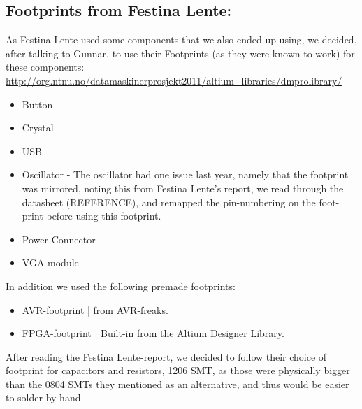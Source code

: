 \subsection{Footprints from Festina Lente:}
As Festina Lente used some components that we also ended up using, we decided,
after talking to Gunnar, to use
their Footprints (as they were known to work) for these components:
\url{http://org.ntnu.no/datamaskinerprosjekt2011/altium_libraries/dmprolibrary/}
\begin{itemize}
\item Button
\item Crystal
\item USB
\item Oscillator - The oscillator had one issue last year, namely that the
  footprint was mirrored, noting this from Festina Lente's report, we read
  through the datasheet (REFERENCE), and remapped the
  pin-numbering on the foot-print before using this footprint.
\item Power Connector
\item VGA-module
\end{itemize}

In addition we used the following premade footprints:
\begin{itemize}
\item AVR-footprint | from AVR-freaks.
\item FPGA-footprint | Built-in from the Altium Designer Library.
\end{itemize}

After reading the Festina Lente-report, we decided to follow their
choice of footprint for capacitors and resistors, 1206 SMT, as those were physically bigger
than the 0804 SMTs they mentioned as an alternative, and thus would be easier to solder by hand.
